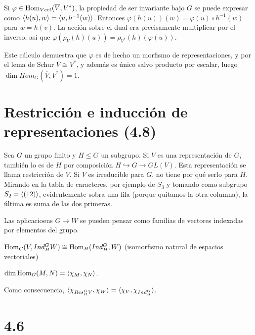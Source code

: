 \documentclass[ANAyTR.tex]{subfiles}
\begin{document}
Si $\varphi\in\operatorname{Hom}_{Vect}(\overline{V},V^*)$, la propiedad de ser invariante bajo $G$ se puede expresar como $\langle{h(u),w}\rangle=\langle{u,h^{-1}(w)}\rangle$. Entonces $\varphi(h(u))(w)=\varphi(u)\circ h^{-1}(w)$ para $w=h(v)$.  La acción sobre el dual era precisamente multiplicar por el inverso, así que $\varphi(\rho_V(h)(u))=\rho_{V^*}(h)(\varphi(u))$. 

Este cálculo demuestra que $\varphi$ es de hecho un morfismo de representaciones, y por el lema de Schur $\overline{V}\cong V^*$, y además es único salvo producto por escalar, luego $\dim Hom_G(\overline{V},V^*)=1$. 

\section{Restricción e inducción de representaciones (4.8)}
Sea $G$ un grupo finito y $H\leq G$ un subgrupo. Si $V$ es una representación de $G$, también lo es de $H$ por composición $H\hookrightarrow G\to GL(V)$. Esta representación se llama restricción de $V$. Si $V$ es irreducible para $G$, no tiene por qué serlo para $H$. Mirando en la tabla de caracteres, por ejemplo de $S_3$ y tomando como subgrupo $S_2=\langle{(12)}\rangle$, evidentemente sobra una fila (porque quitamos la otra columna), la última es suma de las dos primeras. 

Las aplicacioens $G\to W$ se pueden pensar como familias de vectores indexadas por elementos del grupo. 


\begin{teorema}
$\operatorname{Hom}_G(V,Ind^G_HW)\cong \operatorname{Hom}_H(Ind^G_H,W)$ (isomorfismo natural de espacios vectoriales)
\end{teorema}
$\dim \operatorname{Hom}_G(M,N)=\langle{\chi_M,\chi_N}\rangle$. 

Como consecuencia, $\langle{\chi_{Res^G_H V},\chi_W}\rangle=\langle{\chi_V,\chi_{Ind^G_H}}\rangle$. 

\section{4.6}
\end{document}
